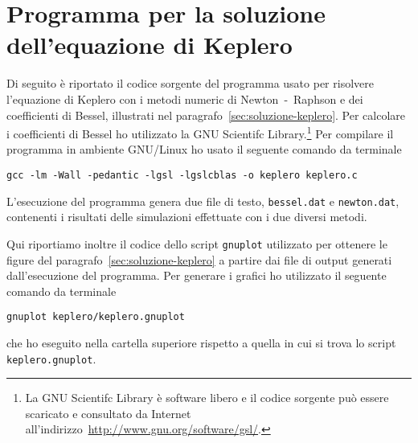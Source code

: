 \chapter{Programma per la soluzione dell'equazione di Keplero}
\label{cha:soluzione-keplero}

Di seguito è riportato il codice sorgente del programma usato per risolvere
l'equazione di Keplero con i metodi numeric di Newton~-~Raphson e dei
coefficienti di Bessel, illustrati nel
paragrafo~\ref{sec:soluzione-keplero}. Per calcolare i coefficienti di Bessel ho
utilizzato la GNU Scientifc
Library.\footnote{La GNU Scientifc Library è software libero e il codice
  sorgente può essere scaricato e consultato da Internet
  all'indirizzo~\url{http://www.gnu.org/software/gsl/}.}
Per compilare il programma in ambiente GNU/Linux ho usato il seguente comando da
terminale
\begin{verbatim}
gcc -lm -Wall -pedantic -lgsl -lgslcblas -o keplero keplero.c
\end{verbatim}
L'esecuzione del programma genera due file di testo, \verb|bessel.dat| e
\verb|newton.dat|, contenenti i risultati delle simulazioni effettuate con i due
diversi metodi.
% 

Qui riportiamo inoltre il codice dello script \verb|gnuplot| utilizzato per
ottenere le figure del paragrafo~\ref{sec:soluzione-keplero} a partire dai file
di output generati dall'esecuzione del programma. Per generare i grafici ho
utilizzato il seguente comando da terminale
\begin{verbatim}
gnuplot keplero/keplero.gnuplot
\end{verbatim}
che ho eseguito nella cartella superiore rispetto a quella in cui si trova lo
script \verb|keplero.gnuplot|.


